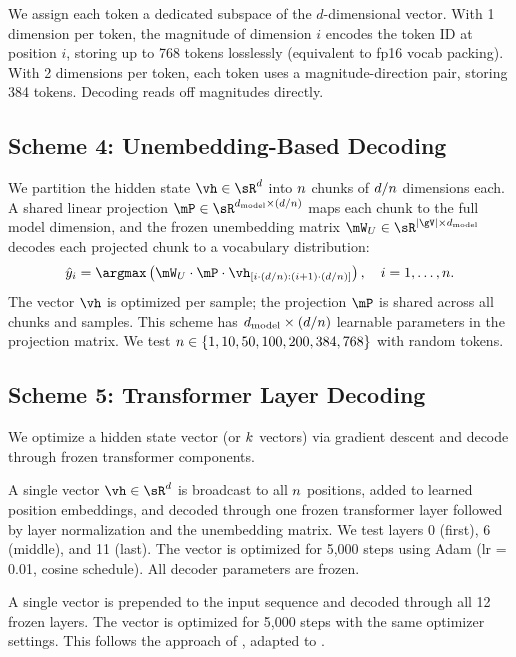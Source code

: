 We assign each token a dedicated subspace of the $d$-dimensional vector. With 1 dimension per token, the magnitude of dimension $i$ encodes the token ID at position $i$, storing up to 768 tokens losslessly (equivalent to fp16 vocab packing). With 2 dimensions per token, each token uses a magnitude-direction pair, storing 384 tokens. Decoding reads off magnitudes directly.

\subsection{Scheme 4: Unembedding-Based Decoding}
\label{sec:method_unembed}

We partition the hidden state $\vh \in \sR^d$ into $n$ chunks of $d/n$ dimensions each. A shared linear projection $\mP \in \sR^{\dmodel \times (d/\numtok)}$ maps each chunk to the full model dimension, and the frozen unembedding matrix $\mW_U \in \sR^{\vocabsize \times \dmodel}$ decodes each projected chunk to a vocabulary distribution:
\begin{equation}
    \hat{y}_i = \argmax \left( \mW_U \cdot \mP \cdot \vh_{[i \cdot (d/\numtok) : (i+1) \cdot (d/\numtok)]} \right), \quad i = 1, \ldots, \numtok.
    \label{eq:unembed}
\end{equation}
The vector $\vh$ is optimized per sample; the projection $\mP$ is shared across all chunks and samples. This scheme has $d_{\mathrm{model}} \times (d/n)$ learnable parameters in the projection matrix. We test $n \in \{1, 10, 50, 100, 200, 384, 768\}$ with random tokens.

\subsection{Scheme 5: Transformer Layer Decoding}
\label{sec:method_layer}

We optimize a hidden state vector (or $k$ vectors) via gradient descent and decode through frozen transformer components.

 A single vector $\vh \in \sR^d$ is broadcast to all $n$ positions, added to learned position embeddings, and decoded through one frozen transformer layer followed by layer normalization and the unembedding matrix. We test layers 0 (first), 6 (middle), and 11 (last). The vector is optimized for 5,000 steps using Adam (lr = 0.01, cosine schedule). All decoder parameters are frozen.

 A single \memvec vector is prepended to the input sequence and decoded through all 12 frozen \gptwo layers. The \memvec vector is optimized for 5,000 steps with the same optimizer settings. This follows the approach of \citet{kuratov2025cramming}, adapted to \gptwo.

